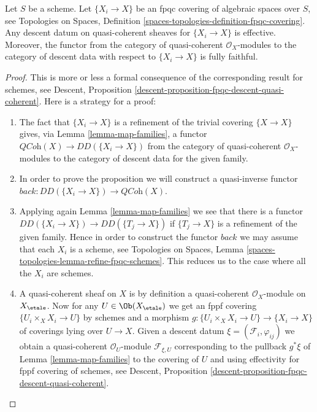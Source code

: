 \begin{proposition}
\label{proposition-fpqc-descent-quasi-coherent}
Let $S$ be a scheme.
Let $\{X_i \to X\}$ be an fpqc covering of algebraic spaces over $S$, see
Topologies on Spaces,
Definition \ref{spaces-topologies-definition-fpqc-covering}.
Any descent datum on quasi-coherent sheaves
for $\{X_i \to X\}$ is effective.
Moreover, the functor from the category of
quasi-coherent $\mathcal{O}_X$-modules to the category
of descent data with respect to $\{X_i \to X\}$ is fully faithful.
\end{proposition}

\begin{proof}
This is more or less a formal consequence of
the corresponding result for schemes, see
Descent, Proposition \ref{descent-proposition-fpqc-descent-quasi-coherent}.
Here is a strategy for a proof:
\begin{enumerate}
\item The fact that $\{X_i \to X\}$ is a refinement of the trivial
covering $\{X \to X\}$ gives, via
Lemma \ref{lemma-map-families},
a functor $\textit{QCoh}(X) \to DD(\{X_i \to X\})$ from the category of
quasi-coherent $\mathcal{O}_X$-modules to the category of descent data
for the given family.
\item In order to prove the proposition we will construct a
quasi-inverse functor $back : DD(\{X_i \to X\}) \to \textit{QCoh}(X)$.
\item Applying again
Lemma \ref{lemma-map-families}
we see that there is a functor
$DD(\{X_i \to X\}) \to DD(\{T_j \to X\})$
if $\{T_j \to X\}$ is a refinement of the given family.
Hence in order to construct the functor $back$ we may assume that
each $X_i$ is a scheme, see
Topologies on Spaces,
Lemma \ref{spaces-topologies-lemma-refine-fpqc-schemes}.
This reduces us to the case where all the $X_i$ are schemes.
\item A quasi-coherent sheaf on $X$ is by definition a quasi-coherent
$\mathcal{O}_X$-module on $X_\etale$. Now for any
$U \in \Ob(X_\etale)$ we get an fppf covering
$\{U_i \times_X X_i \to U\}$ by schemes and a morphism
$g : \{U_i \times_X X_i \to U\} \to \{X_i \to X\}$ of coverings
lying over $U \to X$. Given a descent datum
$\xi = (\mathcal{F}_i, \varphi_{ij})$ we obtain a quasi-coherent
$\mathcal{O}_U$-module $\mathcal{F}_{\xi, U}$ corresponding
to the pullback $g^*\xi$ of
Lemma \ref{lemma-map-families}
to the covering of $U$ and using effectivity for fppf covering of schemes, see
Descent, Proposition \ref{descent-proposition-fpqc-descent-quasi-coherent}.

\end{enumerate}
\end{proof}
